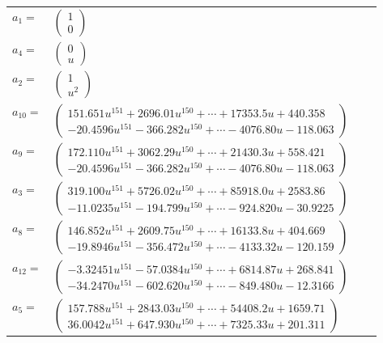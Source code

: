 \documentclass[1p]{elsarticle_modified}
\theoremstyle{definition}
\begin{document}
\begin{tabular}{m{7pt} m{180pt} m{7pt} m{180pt} }
\flushright $a_{1}=$&$\begin{pmatrix}1\\0\end{pmatrix}$ \\
\flushright $a_{4}=$&$\begin{pmatrix}0\\u\end{pmatrix}$ \\
\flushright $a_{2}=$&$\begin{pmatrix}1\\u^2\end{pmatrix}$ \\
\flushright $a_{10}=$&$\begin{pmatrix}151.651 u^{151}+2696.01 u^{150}+\cdots+17353.5 u+440.358\\-20.4596 u^{151}-366.282 u^{150}+\cdots-4076.80 u-118.063\end{pmatrix}$ \\
\flushright $a_{9}=$&$\begin{pmatrix}172.110 u^{151}+3062.29 u^{150}+\cdots+21430.3 u+558.421\\-20.4596 u^{151}-366.282 u^{150}+\cdots-4076.80 u-118.063\end{pmatrix}$ \\
\flushright $a_{3}=$&$\begin{pmatrix}319.100 u^{151}+5726.02 u^{150}+\cdots+85918.0 u+2583.86\\-11.0235 u^{151}-194.799 u^{150}+\cdots-924.820 u-30.9225\end{pmatrix}$ \\
\flushright $a_{8}=$&$\begin{pmatrix}146.852 u^{151}+2609.75 u^{150}+\cdots+16133.8 u+404.669\\-19.8946 u^{151}-356.472 u^{150}+\cdots-4133.32 u-120.159\end{pmatrix}$ \\
\flushright $a_{12}=$&$\begin{pmatrix}-3.32451 u^{151}-57.0384 u^{150}+\cdots+6814.87 u+268.841\\-34.2470 u^{151}-602.620 u^{150}+\cdots-849.480 u-12.3166\end{pmatrix}$ \\
\flushright $a_{5}=$&$\begin{pmatrix}157.788 u^{151}+2843.03 u^{150}+\cdots+54408.2 u+1659.71\\36.0042 u^{151}+647.930 u^{150}+\cdots+7325.33 u+201.311\end{pmatrix}$ \\

\end{tabular}
\end{document}
